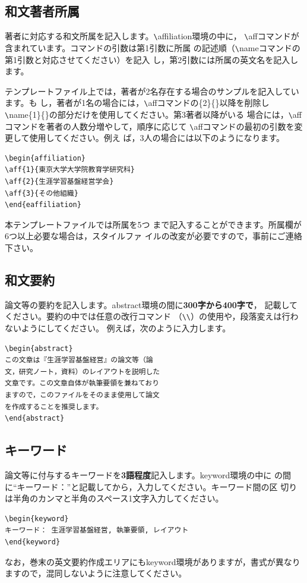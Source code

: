 \documentclass[b5paper,10pt,twocolumn,tombow]{jarticle}
\begin{document}
\subsection{和文著者所属}
著者に対応する和文所属を記入します。\verb|\|affiliation環境の中に，
\verb|\|affコマンドが含まれています。コマンドの引数は第1引数に所属
の記述順（\verb|\|nameコマンドの第1引数と対応させてください）を記入
し，第2引数には所属の英文名を記入します。


テンプレートファイル上では，著者が2名存在する場合のサンプルを記入しています。も
し，著者が1名の場合には，\verb|\|affコマンドの\{2\}\{\}以降を削除し
\verb|\|name\{1\}\{\}の部分だけを使用してください。第3著者以降がいる
場合には，\verb|\|affコマンドを著者の人数分増やして，順序に応じて
\verb|\|affコマンドの最初の引数を変更して使用してください。例え
ば，3人の場合には以下のようになります。

\begin{verbatim}
\begin{affiliation}
\aff{1}{東京大学大学院教育学研究科}
\aff{2}{生涯学習基盤経営学会}
\aff{3}{その他組織}
\end{eaffiliation}
\end{verbatim}
本テンプレートファイルでは所属を5つ
まで記入することができます。所属欄が6つ以上必要な場合は，スタイルファ
イルの改変が必要ですので，事前にご連絡下さい。


\subsection{和文要約}
論文等の要約を記入します。abstract環境の間に\textbf{300字から400字で}，
記載してください。要約の中では任意の改行コマンド
（\verb|\|\verb|\|）の使用や，段落変えは行わないようにしてください。
例えば，次のように入力します。
\begin{verbatim}
\begin{abstract}
この文章は『生涯学習基盤経営』の論文等（論
文，研究ノート，資料）のレイアウトを説明した
文章です。この文章自体が執筆要領を兼ねており
ますので，このファイルをそのまま使用して論文
を作成することを推奨します。
\end{abstract}

\end{verbatim}


\subsection{キーワード}
論文等に付与するキーワードを\textbf{3語程度}記入します。keyword環境の中に
の間に``キーワード：''と記載してから，入力してください。キーワード間の区
切りは半角のカンマと半角のスペース1文字入力してください。
\begin{verbatim}
\begin{keyword}
キーワード： 生涯学習基盤経営, 執筆要領, レイアウト
\end{keyword}
\end{verbatim}
なお，巻末の英文要約作成エリアにもkeyword環境がありますが，書式が異なり
ますので，混同しないように注意してください。
\end{document}
